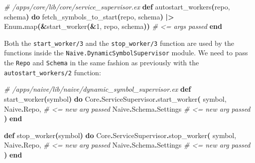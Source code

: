 \documentclass[
  oneside]{book}
\newenvironment{Shaded}{\begin{snugshade}}{\end{snugshade}}
\newcommand{\CommentTok}[1]{\textcolor[rgb]{0.56,0.35,0.01}{\textit{#1}}}
\newcommand{\ConstantTok}[1]{\textcolor[rgb]{0.56,0.35,0.01}{#1}}
\newcommand{\DecValTok}[1]{\textcolor[rgb]{0.00,0.00,0.81}{#1}}
\newcommand{\FunctionTok}[1]{\textcolor[rgb]{0.13,0.29,0.53}{\textbf{#1}}}
\newcommand{\KeywordTok}[1]{\textcolor[rgb]{0.13,0.29,0.53}{\textbf{#1}}}
\newcommand{\NormalTok}[1]{#1}
\newcommand{\OperatorTok}[1]{\textcolor[rgb]{0.81,0.36,0.00}{\textbf{#1}}}
\begin{document}
\begin{Shaded}
\begin{Highlighting}[]
  \CommentTok{\# /apps/core/lib/core/service\_supervisor.ex}
  \KeywordTok{def}\NormalTok{ autostart\_workers}\FunctionTok{(}\NormalTok{repo, schema}\FunctionTok{)} \KeywordTok{do}
\NormalTok{    fetch\_symbols\_to\_start}\FunctionTok{(}\NormalTok{repo, schema}\FunctionTok{)}
    \OperatorTok{|\textgreater{}} \ConstantTok{Enum}\OperatorTok{.}\NormalTok{map}\FunctionTok{(}\OperatorTok{\&}\NormalTok{start\_worker}\FunctionTok{(}\OperatorTok{\&}\DecValTok{1}\NormalTok{, repo, schema}\FunctionTok{))} \CommentTok{\# \textless{}= args passed}
  \KeywordTok{end}
\end{Highlighting}
\end{Shaded}

Both the \texttt{start\_worker/3} and the \texttt{stop\_worker/3} function are used by the functions inside the \texttt{Naive.DynamicSymbolSupervisor} module. We need to pass the \texttt{Repo} and \texttt{Schema} in the same fashion as previously with the \texttt{autostart\_workers/2} function:

\begin{Shaded}
\begin{Highlighting}[]
  \CommentTok{\# /apps/naive/lib/naive/dynamic\_symbol\_supervisor.ex}
  \KeywordTok{def}\NormalTok{ start\_worker}\FunctionTok{(}\NormalTok{symbol}\FunctionTok{)} \KeywordTok{do}
    \ConstantTok{Core}\OperatorTok{.}\ConstantTok{ServiceSupervisor}\OperatorTok{.}\NormalTok{start\_worker}\FunctionTok{(}
\NormalTok{      symbol,}
      \ConstantTok{Naive}\OperatorTok{.}\ConstantTok{Repo}\NormalTok{,            }\CommentTok{\# \textless{}= new arg passed}
      \ConstantTok{Naive}\OperatorTok{.}\ConstantTok{Schema}\OperatorTok{.}\ConstantTok{Settings}  \CommentTok{\# \textless{}= new arg passed}
    \FunctionTok{)}
  \KeywordTok{end}

  \KeywordTok{def}\NormalTok{ stop\_worker}\FunctionTok{(}\NormalTok{symbol}\FunctionTok{)} \KeywordTok{do}
    \ConstantTok{Core}\OperatorTok{.}\ConstantTok{ServiceSupervisor}\OperatorTok{.}\NormalTok{stop\_worker}\FunctionTok{(}
\NormalTok{      symbol,}
      \ConstantTok{Naive}\OperatorTok{.}\ConstantTok{Repo}\NormalTok{,           }\CommentTok{\# \textless{}= new arg passed}
      \ConstantTok{Naive}\OperatorTok{.}\ConstantTok{Schema}\OperatorTok{.}\ConstantTok{Settings} \CommentTok{\# \textless{}= new arg passed}
    \FunctionTok{)}
  \KeywordTok{end}
\end{Highlighting}
\end{Shaded}
\end{document}
